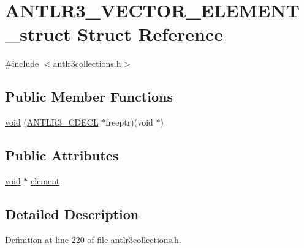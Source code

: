 \hypertarget{struct_a_n_t_l_r3___v_e_c_t_o_r___e_l_e_m_e_n_t__struct}{\section{A\-N\-T\-L\-R3\-\_\-\-V\-E\-C\-T\-O\-R\-\_\-\-E\-L\-E\-M\-E\-N\-T\-\_\-struct Struct Reference}
\label{struct_a_n_t_l_r3___v_e_c_t_o_r___e_l_e_m_e_n_t__struct}
}


{\ttfamily \#include $<$antlr3collections.\-h$>$}

\subsection*{Public Member Functions}
\begin{DoxyCompactItemize}
\item 
\hyperlink{struct_a_n_t_l_r3___v_e_c_t_o_r___e_l_e_m_e_n_t__struct_a3d6589d5dbba86848f96fc568694b1a9}{void} (\hyperlink{antlr3defs_8h_a91c919dd260a95cc88a0cd9b5c0a11cc}{A\-N\-T\-L\-R3\-\_\-\-C\-D\-E\-C\-L} $\ast$freeptr)(void $\ast$)
\end{DoxyCompactItemize}
\subsection*{Public Attributes}
\begin{DoxyCompactItemize}
\item 
\hyperlink{struct_a_n_t_l_r3___v_e_c_t_o_r___e_l_e_m_e_n_t__struct_a3d6589d5dbba86848f96fc568694b1a9}{void} $\ast$ \hyperlink{struct_a_n_t_l_r3___v_e_c_t_o_r___e_l_e_m_e_n_t__struct_afc31c9b68b5b9851f21a38a3281b182b}{element}
\end{DoxyCompactItemize}


\subsection{Detailed Description}


Definition at line 220 of file antlr3collections.\-h.



